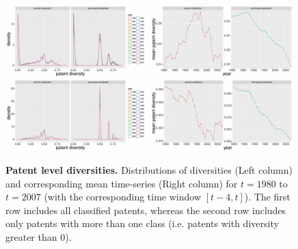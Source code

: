 \documentclass[12pt,twoside,a4paper]{article}
\begin{document}
\begin{figure}
\includegraphics[width=0.49\textwidth]{patentlevelorigs_all_semcounts.jpg}
\includegraphics[width=0.49\textwidth]{patentlevelorigs_all_ts_semcounts.jpg}\\
\includegraphics[width=0.49\textwidth]{patentlevelorigs_positive_semcounts.jpg}
\includegraphics[width=0.49\textwidth]{patentlevelorigs_positive_ts_semcounts.jpg}
\caption{
\textbf{Patent level diversities.} Distributions of diversities (Left column) and corresponding mean time-series (Right column) for $t=1980$ to $t=2007$ (with the corresponding time window $[t-4,t]$). The first row includes all classified patents, whereas the second row includes only patents with more than one class (i.e. patents with diversity greater than 0).
}
\label{fig:patent-level-orig}
\end{figure}
\end{document}
